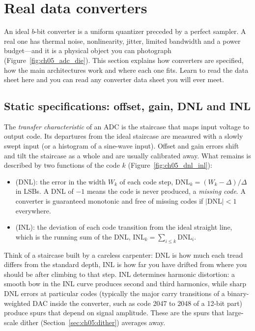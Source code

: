 \section{Real data converters}
\label{sec:ch05:adc}

An ideal $b$-bit converter is a uniform quantizer preceded by a perfect sampler. A real one has
thermal noise, nonlinearity, jitter, limited bandwidth and a power budget---and it is a physical
object you can photograph (Figure~\ref{fig:ch05_adc_die}). This section explains how converters
are specified, how the main architectures work and where each one fits. Learn to read the data
sheet here and you can read any converter data sheet you will ever meet.

\subsection{Static specifications: offset, gain, DNL and INL}

The \emph{transfer characteristic} of an ADC is the staircase that maps input voltage to output
code. Its departures from the ideal staircase are measured with a slowly swept input (or a
histogram of a sine-wave input). Offset and gain errors shift and tilt the staircase as a whole
and are usually calibrated away. What remains is described by two functions of the code $k$
(Figure~\ref{fig:ch05_dnl_inl}):
\begin{itemize}
\item {} (DNL): the error in the width $W_k$ of each code step,
$\mathrm{DNL}_k=(W_k-\Delta)/\Delta$ in LSBs. A DNL of $-1$ means the code is never produced, a
\emph{missing code}. A converter is guaranteed monotonic and free of missing codes if
$|\mathrm{DNL}|<1$ everywhere.
\item {} (INL): the deviation of each code transition from the ideal
straight line, which is the running sum of the DNL, $\mathrm{INL}_k=\sum_{i\le k}\mathrm{DNL}_i$.
\end{itemize}
Think of a staircase built by a careless carpenter: DNL is how much each tread differs from the
standard depth, INL is how far you have drifted from where you should be after climbing to that
step. INL determines harmonic distortion: a smooth bow in the INL curve produces second and third
harmonics, while sharp DNL errors at particular codes (typically the major carry transitions of
a binary-weighted DAC inside the converter, such as code 2047 to 2048 of a 12-bit part) produce
spurs that depend on signal amplitude. These are the spurs that large-scale dither
(Section~\ref{sec:ch05:dither}) averages away.

